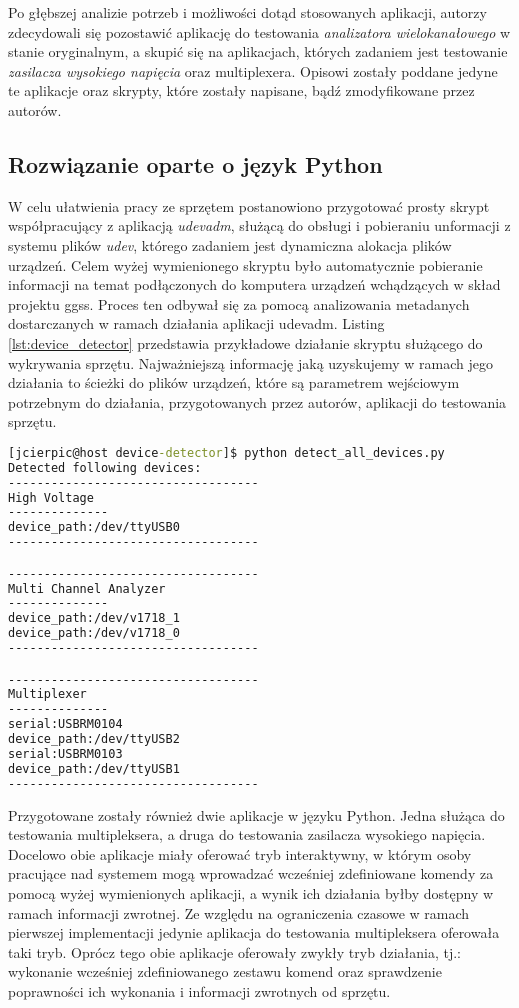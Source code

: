 Po głębszej analizie potrzeb i możliwości dotąd stosowanych aplikacji, autorzy zdecydowali się pozostawić aplikację do testowania \emph{analizatora wielokanałowego} w stanie oryginalnym, a skupić się na aplikacjach, których zadaniem jest testowanie \emph{zasilacza wysokiego napięcia} oraz {multiplexera}. Opisowi zostały poddane jedyne te aplikacje oraz skrypty, które zostały napisane, bądź zmodyfikowane przez autorów.

\subsection{Rozwiązanie oparte o język Python}

W celu ułatwienia pracy ze sprzętem postanowiono przygotować prosty skrypt współpracujący z aplikacją \emph{udevadm}, służącą do obsługi i pobieraniu unformacji z systemu plików \emph{udev}, którego zadaniem jest dynamiczna alokacja plików urządzeń. Celem wyżej wymienionego skryptu było automatycznie pobieranie informacji na temat podłączonych do komputera urządzeń wchądzących w skład projektu ggss. Proces ten odbywał się za pomocą analizowania metadanych dostarczanych w ramach działania aplikacji udevadm. Listing \ref{lst:device_detector} przedstawia przykładowe działanie skryptu służącego do wykrywania sprzętu. Najważniejszą informację jaką uzyskujemy w ramach jego działania to ścieżki do plików urządzeń, które są parametrem wejściowym potrzebnym do działania, przygotowanych przez autorów, aplikacji do testowania sprzętu.

\begin{lstlisting}[language=cmd,caption={Przykład działania skryptu do automatycznego wykrywania podłączonego sprzętu},label={lst:device_detector},frame=single]
[jcierpic@host device-detector]$ python detect_all_devices.py
Detected following devices:
-----------------------------------
High Voltage
--------------
device_path:/dev/ttyUSB0
-----------------------------------

-----------------------------------
Multi Channel Analyzer
--------------
device_path:/dev/v1718_1
device_path:/dev/v1718_0
-----------------------------------

-----------------------------------
Multiplexer
--------------
serial:USBRM0104
device_path:/dev/ttyUSB2
serial:USBRM0103
device_path:/dev/ttyUSB1
-----------------------------------
\end{lstlisting}

Przygotowane zostały również dwie aplikacje w języku Python. Jedna służąca do testowania multipleksera, a druga do testowania zasilacza wysokiego napięcia. Docelowo obie aplikacje miały oferować tryb interaktywny, w którym osoby pracujące nad systemem mogą wprowadzać wcześniej zdefiniowane komendy za pomocą wyżej wymienionych aplikacji, a wynik ich działania byłby dostępny w ramach informacji zwrotnej. Ze względu na ograniczenia czasowe w ramach pierwszej implementacji jedynie aplikacja do testowania multipleksera oferowała taki tryb. Oprócz tego obie aplikacje oferowały zwykły tryb działania, tj.: wykonanie wcześniej zdefiniowanego zestawu komend oraz sprawdzenie poprawności ich wykonania i informacji zwrotnych od sprzętu.


